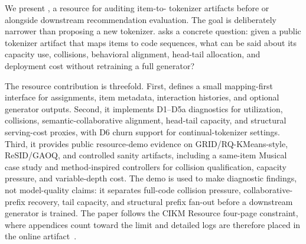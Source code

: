 We present \tool, a resource for auditing item-to-\sid{} tokenizer artifacts
before or alongside downstream recommendation evaluation. The goal is
deliberately narrower than proposing a new tokenizer. \tool asks a concrete
question: given a public tokenizer artifact that maps items to code sequences,
what can be said about its capacity use, collisions, behavioral alignment,
head-tail allocation, and deployment cost without retraining a full generator?

The resource contribution is threefold. First, \tool defines a small
mapping-first interface for \sid assignments, item metadata, interaction
histories, and optional generator outputs. Second, it implements D1--D5a
diagnostics for utilization, collisions, semantic-collaborative alignment,
head-tail capacity, and structural serving-cost proxies, with D6 churn support
for continual-tokenizer settings. Third, it provides public resource-demo
evidence on GRID/RQ-KMeans-style, ReSID/GAOQ, and controlled sanity artifacts,
including a same-item Musical case study and method-inspired controllers for
collision qualification, capacity pressure, and variable-depth cost. The demo
is used to make diagnostic
findings, not model-quality claims: it separates full-code collision pressure,
collaborative-prefix recovery, tail capacity, and structural prefix fan-out
before a downstream generator is trained. The paper follows the CIKM Resource
four-page constraint, where appendices count toward the limit and detailed logs
are therefore placed in the online artifact~\cite{cikm2026resource}.
